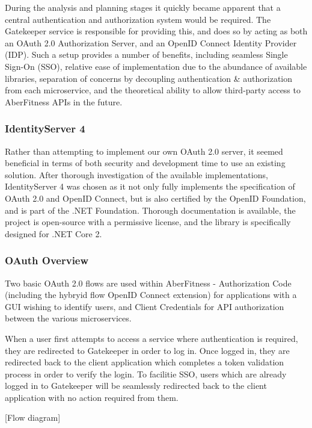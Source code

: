 During the analysis and planning stages it quickly became apparent that a central authentication and authorization system would be required.  The Gatekeeper service is responsible for providing this, and does so by acting as both an OAuth 2.0 Authorization Server, and an OpenID Connect Identity Provider (IDP).  Such a setup provides a number of benefits, including seamless Single Sign-On (SSO), relative ease of implementation due to the abundance of available libraries, separation of concerns by decoupling authentication \& authorization from each microservice, and the theoretical ability to allow third-party access to AberFitness APIs in the future.

\subsubsection{IdentityServer 4}

Rather than attempting to implement our own OAuth 2.0 server, it seemed beneficial in terms of both security and development time to use an existing solution.  After thorough investigation of the available implementations, IdentityServer 4 was chosen as it not only fully implements the specification of OAuth 2.0 and OpenID Connect, but is also certified by the OpenID Foundation, and is part of the .NET Foundation.  Thorough documentation is available, the project is open-source with a permissive license, and the library is specifically designed for .NET Core 2.

\subsubsection{OAuth Overview}

Two basic OAuth 2.0 flows are used within AberFitness - Authorization Code (including the hybryid flow OpenID Connect extension) for applications with a GUI wishing to identify users, and Client Credentials for API authorization between the various microservices.

When a user first attempts to access a service where authentication is required, they are redirected to Gatekeeper in order to log in.  Once logged in, they are redirected back to the client application which completes a token validation process in order to verify the login.  To facilitie SSO, users which are already logged in to Gatekeeper will be seamlessly redirected back to the client application with no action required from them.

[Flow diagram]

